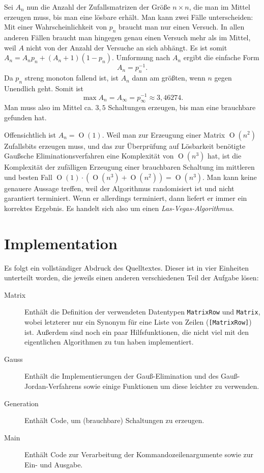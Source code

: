\documentclass{scrartcl}
\DeclareMathOperator{\bigO}{O}
\begin{document}
Sei $A_n$ nun die Anzahl der Zufallsmatrizen der Größe $n\times n$, die man im
Mittel erzeugen muss, bis man eine lösbare erhält. Man kann zwei Fälle
unterscheiden: Mit einer Wahrscheinlichkeit von $p_n$ braucht man nur einen
Versuch. In allen anderen Fällen braucht man hingegen genau einen Versuch mehr
als im Mittel, weil $A$ nicht von der Anzahl der Versuche an sich abhängt. Es
ist somit $A_n=A_np_n+(A_n+1)(1-p_n)$. Umformung nach $A_n$ ergibt die
einfache Form
\begin{equation}
A_n=p_n^{-1}.
\end{equation}
Da $p_n$ streng monoton fallend ist, ist $A_n$ dann am größten, wenn $n$ gegen
Unendlich geht. Somit ist
\begin{equation}
\max A_n = A_\infty = p_\infty^{-1} \approx 3{,}46274.
\end{equation}
Man muss also im Mittel ca. $3{,}5$ Schaltungen erzeugen, bis man eine
brauchbare gefunden hat.

Offensichtlich ist $A_n=\bigO(1)$. Weil man zur Erzeugung einer Matrix $\bigO(n^
2)$ Zufallsbits erzeugen muss, und das zur Überprüfung auf Lösbarkeit benötigte
Gaußsche Eliminationsverfahren eine Komplexität von $\bigO(n^3)$ hat, ist die
Komplexität der zufälligen Erzeugung einer brauchbaren Schaltung im mittleren
und besten Fall $\bigO(1)\cdot\left(\bigO(n^3)+\bigO(n^2)\right)=\bigO(n^3)$.
Man kann keine genauere Aussage treffen, weil der Algorithmus randomisiert ist
und nicht garantiert terminiert. Wenn er allerdings terminiert, dann liefert er
immer ein korrektes Ergebnis. Es handelt sich also um einen
\emph{Las-Vegas-Algorithmus}.

\section{Implementation}
Es folgt ein vollständiger Abdruck des Quelltextes. Dieser ist in vier Einheiten
unterteilt worden, die jeweils einen anderen verschiedenen Teil der Aufgabe
lösen:

\begin{description}
\item[Matrix] Enthält die Definition der verwendeten Datentypen \texttt
  {MatrixRow} und \texttt{Matrix}, wobei letzterer nur ein Synonym für eine
  Liste von Zeilen (\texttt{[MatrixRow]}) ist. Außerdem sind noch ein paar
  Hilfsfunktionen, die nicht viel mit den eigentlichen Algorithmen zu tun haben
  implementiert.
\item[Gauss] Enthält die Implementierungen der Gauß-Elimination und des
  Gauß-Jordan-Verfahrens sowie einige Funktionen um diese leichter zu verwenden.
\item[Generation] Enthält Code, um (brauchbare) Schaltungen zu erzeugen.
\item[Main] Enthält Code zur Verarbeitung der Kommandozeilenargumente sowie zur
  Ein- und Ausgabe.
\end{description}
\end{document}
